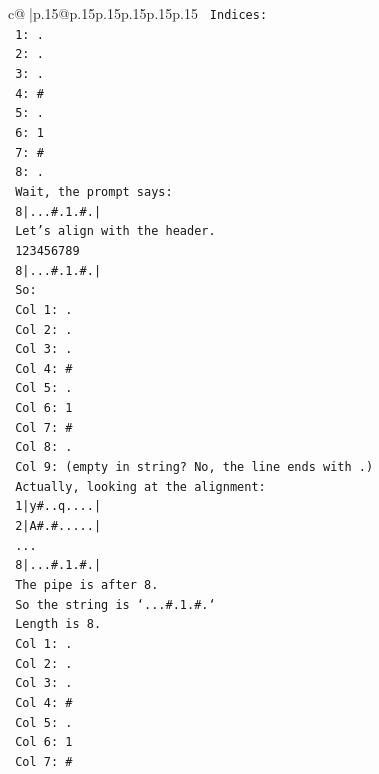 \documentclass{article}
\begin{document}
{\begin{supertabular}{c@{$\;$}|p{.15\linewidth}@{}p{.15\linewidth}p{.15\linewidth}p{.15\linewidth}p{.15\linewidth}p{.15\linewidth}}
{{{\texttt{   Indices:} \\
\texttt{   1: .} \\
\texttt{   2: .} \\
\texttt{   3: .} \\
\texttt{   4: \#} \\
\texttt{   5: .} \\
\texttt{   6: 1} \\
\texttt{   7: \#} \\
\texttt{   8: .} \\
\texttt{   Wait, the prompt says:} \\
\texttt{   8|...\#.1.\#.|} \\
\texttt{   Let's align with the header.} \\
\texttt{   123456789} \\
\texttt{   8|...\#.1.\#.|} \\
\texttt{   So:} \\
\texttt{   Col 1: .} \\
\texttt{   Col 2: .} \\
\texttt{   Col 3: .} \\
\texttt{   Col 4: \#} \\
\texttt{   Col 5: .} \\
\texttt{   Col 6: 1} \\
\texttt{   Col 7: \#} \\
\texttt{   Col 8: .} \\
\texttt{   Col 9: (empty in string? No, the line ends with .)} \\
\texttt{   Actually, looking at the alignment:} \\
\texttt{   1|y\#..q....|} \\
\texttt{   2|A\#.\#.....|} \\
\texttt{   ...} \\
\texttt{   8|...\#.1.\#.|} \\
\texttt{   The pipe is after 8.} \\
\texttt{   So the string is `...\#.1.\#.`} \\
\texttt{   Length is 8.} \\
\texttt{   Col 1: .} \\
\texttt{   Col 2: .} \\
\texttt{   Col 3: .} \\
\texttt{   Col 4: \#} \\
\texttt{   Col 5: .} \\
\texttt{   Col 6: 1} \\
\texttt{   Col 7: \#} \\
}}}
\end{supertabular}}
\end{document}

